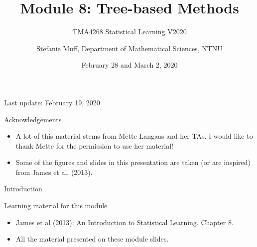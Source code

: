 \documentclass[10pt,ignorenonframetext,]{beamer}
\title{Module 8: Tree-based Methods}
\subtitle{TMA4268 Statistical Learning V2020}
\author{Stefanie Muff, Department of Mathematical Sciences, NTNU}
\date{February 28 and March 2, 2020}
\providecommand{\tightlist}{%
  \setlength{\itemsep}{0pt}\setlength{\parskip}{0pt}}
\begin{document}
\frame{\titlepage}

\begin{frame}

Last update: February 19, 2020

\end{frame}

\begin{frame}{Acknowledgements}

\begin{itemize}
\item
  A lot of this material stems from Mette Langaas and her TAs. I would
  like to thank Mette for the permission to use her material!
\item
  Some of the figures and slides in this presentation are taken (or are
  inspired) from James et al. (2013).
\end{itemize}

\end{frame}

\begin{frame}{Introduction}

\begin{block}{Learning material for this module}

\vspace{2mm}

\begin{itemize}
\tightlist
\item
  James et al (2013): An Introduction to Statistical Learning. Chapter
  8.\\
\item
  All the material presented on these module slides.
\end{itemize}

\end{block}

\end{frame}
\end{document}
